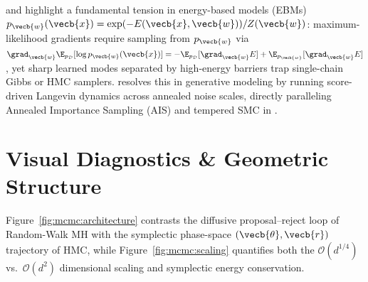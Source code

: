 \documentclass[../../../../master.tex]{subfiles}
\begin{document}
\begin{crossbook}
 and  highlight a fundamental tension in energy-based models (EBMs) $p_{\vecb{w}}(\vecb{x}) = \exp(-E(\vecb{x}, \vecb{w}))/Z(\vecb{w})$: maximum-likelihood gradients require sampling from $p_{\vecb{w}}$ via $\grad_{\vecb{w}}\E_{p_{\mathcal{D}}}[\log p_{\vecb{w}}(\vecb{x})] = -\E_{p_{\mathcal{D}}}[\grad_{\vecb{w}}E] + \E_{p_{\vecb{w}}}[\grad_{\vecb{w}}E]$, yet sharp learned modes separated by high-energy barriers trap single-chain Gibbs or HMC samplers.  resolves this in generative modeling by running score-driven Langevin dynamics across annealed noise scales, directly paralleling Annealed Importance Sampling (AIS) and tempered SMC in .
\end{crossbook}

\section{Visual Diagnostics \& Geometric Structure}
\label{sec:mcmc:visuals}

Figure~\ref{fig:mcmc:architecture} contrasts the diffusive proposal--reject loop of Random-Walk MH with the symplectic phase-space $(\vecb{\theta}, \vecb{r})$ trajectory of HMC, while Figure~\ref{fig:mcmc:scaling} quantifies both the $\mathcal{O}(d^{1/4})$ vs.\ $\mathcal{O}(d^2)$ dimensional scaling and symplectic energy conservation.
\end{document}
